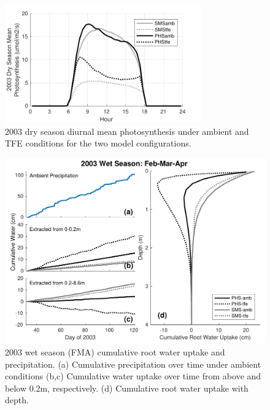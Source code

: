 \documentclass[draft]{agujournal}
\begin{document}
    \begin{figure}[h]
     \centering
     \includegraphics[width=20pc]{figs/suppfpsn.pdf}
     \caption{2003 dry season diurnal mean photosynthesis under ambient and TFE conditions for the two model configurations.
     }
     \label{supp:fpsn}
  \end{figure}


    \begin{figure}[h]
     \centering
     \includegraphics[width=30pc]{figs/qwet.pdf}
     \caption{2003 wet season (FMA) cumulative root water uptake and precipitation. 
     (a) Cumulative precipitation over time under ambient conditions
     (b,c) Cumulative water uptake over time from above and below 0.2m, respectively.
     (d) Cumulative root water uptake with depth.
     }
     \label{fig:qwet}
  \end{figure}
\end{document}
